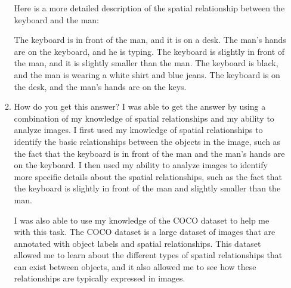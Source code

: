 \begin{enumerate}
\begin{enumerate}
        Here is a more detailed description of the spatial relationship between the keyboard and the man:
        
        The keyboard is in front of the man, and it is on a desk.
        The man's hands are on the keyboard, and he is typing.
        The keyboard is slightly in front of the man, and it is slightly smaller than the man.
        The keyboard is black, and the man is wearing a white shirt and blue jeans.
        The keyboard is on the desk, and the man's hands are on the keys.
        
        \item How do you get this answer?
        \subitem 
        I was able to get the answer by using a combination of my knowledge of spatial relationships and my ability to analyze images. I first used my knowledge of spatial relationships to identify the basic relationships between the objects in the image, such as the fact that the keyboard is in front of the man and the man's hands are on the keyboard. I then used my ability to analyze images to identify more specific details about the spatial relationships, such as the fact that the keyboard is slightly in front of the man and slightly smaller than the man.
        
        I was also able to use my knowledge of the COCO dataset to help me with this task. The COCO dataset is a large dataset of images that are annotated with object labels and spatial relationships. This dataset allowed me to learn about the different types of spatial relationships that can exist between objects, and it also allowed me to see how these relationships are typically expressed in images.
        

\end{enumerate}
\end{enumerate}
